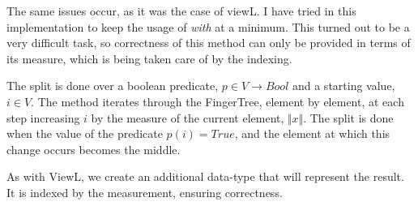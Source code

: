 \documentclass[12pt,twoside,notitlepage]{report}
\begin{document}
The same issues occur, as it was the case of viewL. I have tried in this implementation to keep the usage of \textit{with} at a minimum. This turned out to be a very difficult task, so correctness of this method can only be provided in terms of its measure, which is being taken care of by the indexing.

The split is done over a boolean predicate, $p \in V \to Bool$ and a starting value, $i \in V$. The method iterates through the FingerTree, element by element, at each step increasing $i$ by the measure of the current element, $\Vert x \Vert$. The split is done when the value of the predicate $p(i) = True$, and the element at which this change occurs becomes the middle.


As with ViewL, we create an additional data-type that will represent the result. It is indexed by the measurement, ensuring correctness.

\begin{code}
\\
\>  \AgdaSymbol{\{}\AgdaSymbol{\}} \AgdaSymbol{(} \AgdaSymbol{:}  \AgdaSymbol{)} \AgdaSymbol{(} \AgdaSymbol{:}  \AgdaSymbol{)}\<%
\\
\>[2]\<[12]%
\>[12]  \AgdaSymbol{:}   \<%
\\
\>[2]\<[12]%
\>[12]  \AgdaSymbol{:}     \AgdaSymbol{:}\<%
\\
\>[2]\<[12]%
\>[12]\AgdaSymbol{\{} \AgdaSymbol{:} \AgdaSymbol{\}}    \<%
\\
\>[0]\<[2]%
\>[2] \AgdaSymbol{:}  \AgdaSymbol{\{} \AgdaSymbol{:} \AgdaSymbol{\}} \AgdaSymbol{\{} \AgdaSymbol{:} \AgdaSymbol{\}}\<%
\\
\>[2]\<[10]%
\>[10] \AgdaSymbol{(}   \AgdaSymbol{\{}\AgdaSymbol{\})} \<[35]%
\>[35]\<%
\\
\>[2]\<[10]%
\>[10] \AgdaSymbol{(} \AgdaSymbol{:} \AgdaSymbol{)} \<[35]%
\>[35]\<%
\\
\>[2]\<[10]%
\>[10] \AgdaSymbol{(}   \AgdaSymbol{\{}\AgdaSymbol{\})} \<[35]%
\>[35]\<%
\\
\>[2]\<[10]%
\>[10]    \AgdaSymbol{\{}      \AgdaSymbol{\}}\<%
\\
\end{code}
\end{document}
